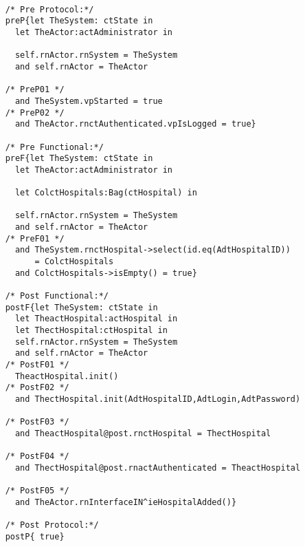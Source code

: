 	\scriptsize
	\vspace{0.5cm}
	\begin{lstlisting}[style=MessirStyle,firstnumber=auto,captionpos=b,caption={\msrmessir (MCL-oriented) specification of the operation \emph{oeAddHospital}.},label=OM-actAdministrator-oeAddHospital-MCL-LST]

	/* Pre Protocol:*/ 
	preP{let TheSystem: ctState in
	  let TheActor:actAdministrator in
	  
	  self.rnActor.rnSystem = TheSystem
	  and self.rnActor = TheActor
	  
	/* PreP01 */
	  and TheSystem.vpStarted = true
	/* PreP02 */
	  and TheActor.rnctAuthenticated.vpIsLogged = true}
	
	/* Pre Functional:*/
	preF{let TheSystem: ctState in
	  let TheActor:actAdministrator in
	 
	  let ColctHospitals:Bag(ctHospital) in
	  
	  self.rnActor.rnSystem = TheSystem
	  and self.rnActor = TheActor
	/* PreF01 */
	  and TheSystem.rnctHospital->select(id.eq(AdtHospitalID))
	      = ColctHospitals
	  and ColctHospitals->isEmpty() = true}
	
	/* Post Functional:*/ 
	postF{let TheSystem: ctState in
	  let TheactHospital:actHospital in
	  let ThectHospital:ctHospital in
	  self.rnActor.rnSystem = TheSystem
	  and self.rnActor = TheActor
	/* PostF01 */
	  TheactHospital.init()
	/* PostF02 */
	  and ThectHospital.init(AdtHospitalID,AdtLogin,AdtPassword)
	
	/* PostF03 */
	  and TheactHospital@post.rnctHospital = ThectHospital
	  
	/* PostF04 */  
	  and ThectHospital@post.rnactAuthenticated = TheactHospital
	   
	/* PostF05 */  
	  and TheActor.rnInterfaceIN^ieHospitalAdded()}
	
	/* Post Protocol:*/ 
	postP{ true}
	
	\end{lstlisting}
	\normalsize 
	
	
	
	






